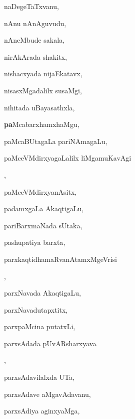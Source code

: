 \begin{multicols}{3}
{\noindent
{naDegeTaTxvanu}, \pageref{naDegeTaTxvanu}

\noindent
{nAnu nAnAguvudu}, \pageref{nAnu nAnAguvudu}

\noindent
{nAneMbude sakala}, \pageref{nAneMbude sakala}

\noindent
{nirAkArada shakitx}, \pageref{nirAkArada shakitx}

\noindent
{nishacxyada nijaEkatavx}, \pageref{nishacxyada nijaEkatavx}

\noindent
{nisasxMgadalilx susaMgi}, \pageref{nisasxMgadalilx susaMgi}

\noindent
{nihitada uBayasathxla}, \pageref{nihitada uBayasathxla}

\noindent
{{\large\textbf{pa}}McabarxhamxhaMgu}, \pageref{paMcabarxhamxhaMgu}

\noindent
{paMcaBUtagaLa pariNAmagaLu}, \pageref{paMcaBUtagaLa pariNAmagaLu}

\noindent
{paMceVMdirxyagaLalilx liMgamuKavAgi}

\noindent
{}, \pageref{paMceVMdirxyagaLalilx liMgamuKavAgi koLuLxvudu}

\noindent
{paMceVMdirxyanAsitx}, \pageref{paMceVMdirxyanAsitx}

\noindent
{padamxgaLa AkaqtigaLu}, \pageref{padamxgaLa AkaqtigaLu}

\noindent
{pariBarxmaNada sUtaka}, \pageref{pariBarxmaNada sUtaka}

\noindent
{pashupatiya barxta}, \pageref{pashupatiya barxta}

\noindent
{parxkaqtidhamaRvanAtamxMgeVrisi}

\noindent
{}, \pageref{parxkaqtidhamaRvanAtamxMgeVrisi kAba jaDa}

\noindent
{parxNavada AkaqtigaLu}, \pageref{parxNavada AkaqtigaLu}

\noindent
{parxNavadutapxtitx}, \pageref{parxNavadutapxtitx}

\noindent
{parxpaMcina putatxLi}, \pageref{parxpaMcina putatxLi}

\noindent
{parxsAdada pUvARsharxyava}

\noindent
{}, \pageref{parxsAdada pUvARsharxyava kaLeyuvudu}

\noindent
{parxsAdavilalxda UTa}, \pageref{parxsAdavilalxda UTa}

\noindent
{parxsAdave aMgavAdavanu}, \pageref{parxsAdave aMgavAdavanu}

\noindent
{parxsAdiya aginxyaMga}, \pageref{parxsAdiya aginxyaMga}

}
\end{multicols}

